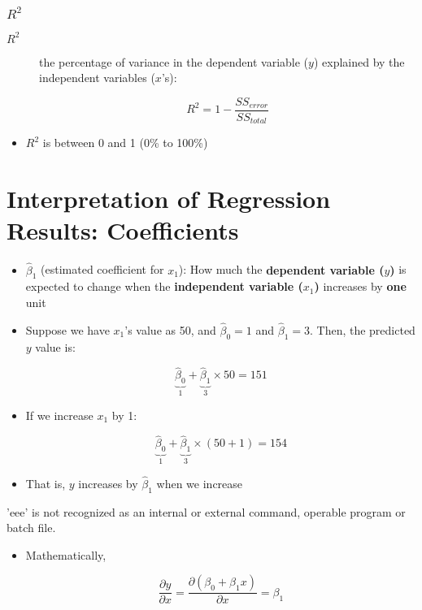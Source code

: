 \documentclass[10pt,article]{article}
\begin{document}
\subsubsection{\(R^2\)}
\label{sec:orgca30e0a}

\begin{description}
\item[{\(R^2\)}] the percentage of variance in the dependent variable (\(y\))
explained by the independent variables (\(x\)'s):

\[ R^2 = 1 - \dfrac{SS_{error}}{SS_{total}} \]
\end{description}

\begin{itemize}
\item \(R^2\) is between 0 and 1 (0\% to 100\%)
\end{itemize}
\section{Interpretation of Regression Results: Coefficients}
\label{sec:org2f749c0}

\begin{itemize}
\item \(\hat{\beta}_1\) (estimated coefficient for \(x_1\)): How much the
 {\bf dependent variable (\( y \))} is expected to change when the
 {\bf independent variable (\( x_{1} \))} increases by
 {\bf one} unit
\end{itemize}

\begin{itemize}
\item Suppose we have \(x_{1}\)'s value as 50, and \(\hat\beta_0 = 1\) and \(\hat\beta_1 = 3\). Then, the predicted \(y\) value is:

\[ \underbrace{\hat\beta_0}_{1} + \underbrace{\hat\beta_1}_{3} \times 50 = 151 \]

\item If we increase \(x_{1}\) by 1:

\[ \underbrace{\hat\beta_0}_{1} + \underbrace{\hat\beta_1}_{3} \times (50 + 1) = 154 \]

\item That is, \(y\) increases by \(\hat\beta_1\) when we increase
\end{itemize}
'eee' is not recognized as an internal or external command,
operable program or batch file.
\begin{itemize}
\item Mathematically,

\[  \dfrac{\partial y}{\partial x} = \dfrac{\partial ( \beta_0 + \beta_1 x)}{\partial x} = \beta_1 \]
\end{itemize}
\end{document}
